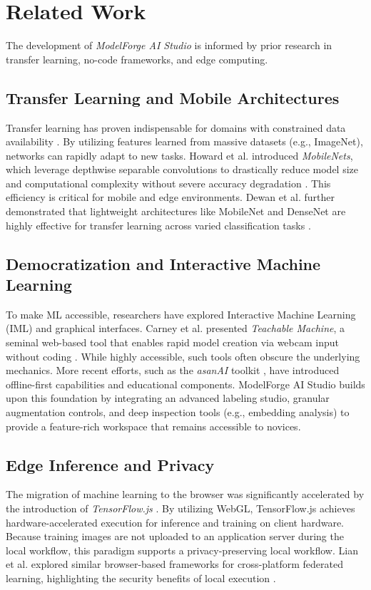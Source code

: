 \documentclass[conference]{IEEEtran}
\begin{document}
\section{Related Work}

The development of \textit{ModelForge AI Studio} is informed by prior research in transfer learning, no-code frameworks, and edge computing.

\subsection{Transfer Learning and Mobile Architectures}
Transfer learning has proven indispensable for domains with constrained data availability \cite{Shao2015}. By utilizing features learned from massive datasets (e.g., ImageNet), networks can rapidly adapt to new tasks. Howard et al. introduced \textit{MobileNets}, which leverage depthwise separable convolutions to drastically reduce model size and computational complexity without severe accuracy degradation \cite{Howard2017}. This efficiency is critical for mobile and edge environments. Dewan et al. further demonstrated that lightweight architectures like MobileNet and DenseNet are highly effective for transfer learning across varied classification tasks \cite{Dewan2023}.

\subsection{Democratization and Interactive Machine Learning}
To make ML accessible, researchers have explored Interactive Machine Learning (IML) and graphical interfaces. Carney et al. presented \textit{Teachable Machine}, a seminal web-based tool that enables rapid model creation via webcam input without coding \cite{Carney2020}. While highly accessible, such tools often obscure the underlying mechanics. More recent efforts, such as the \textit{asanAI} toolkit \cite{Koch2025}, have introduced offline-first capabilities and educational components. ModelForge AI Studio builds upon this foundation by integrating an advanced labeling studio, granular augmentation controls, and deep inspection tools (e.g., embedding analysis) to provide a feature-rich workspace that remains accessible to novices.

\subsection{Edge Inference and Privacy}
The migration of machine learning to the browser was significantly accelerated by the introduction of \textit{TensorFlow.js} \cite{Smilkov2019}. By utilizing WebGL, TensorFlow.js achieves hardware-accelerated execution for inference and training on client hardware. Because training images are not uploaded to an application server during the local workflow, this paradigm supports a privacy-preserving local workflow. Lian et al. explored similar browser-based frameworks for cross-platform federated learning, highlighting the security benefits of local execution \cite{Lian2021}.
\end{document}
